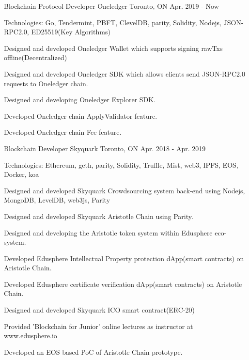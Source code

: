 \vspace{-2.0em}
\begin{cventries}
    \cventry
    {Blockchain Protocol Developer}
    {Oneledger}
    {Toronto, ON}
    {Apr. 2019 - Now}
    {
      \begin{cvitems}
        \item {Technologies: Go, Tendermint, PBFT, ClevelDB, parity, Solidity, Nodejs, JSON-RPC2.0, ED25519(Key Algorithms)}
        \item {Designed and developed Oneledger Wallet which supports signing rawTxs offline(Decentralized)}
        \item {Designed and developed Oneledger SDK which allows clients send JSON-RPC2.0 requests to Oneledger chain.}
        \item {Designed and developing Oneledger Explorer SDK.}
        \item {Developed Oneledger chain ApplyValidator feature.}
        \item {Developed Oneledger chain Fee feature.}
      \end{cvitems}
    }

  \cventry
    {Blockchain Developer}
    {Skyquark}
    {Toronto, ON}
    {Apr. 2018 - Apr. 2019}
    {
      \begin{cvitems}
        \item {Technologies: Ethereum, geth, parity, Solidity, Truffle, Mist, web3, IPFS, EOS, Docker, koa}
        \item {Designed and developed Skyquark Crowdsourcing system back-end using Nodejs, MongoDB, LevelDB, web3js, Parity}
        \item {Designed and developed Skyquark Aristotle Chain using Parity.}
        \item {Designed and developing the Aristotle token system within Edusphere eco-system.}
        \item {Developed Edusphere Intellectual Property protection dApp(smart contracts) on Aristotle Chain.}
        \item {Developed Edusphere certificate verification dApp(smart contracts) on Aristotle Chain.}
        \item {Designed and developed Skyquark ICO smart contract(ERC-20)}
        \item {Provided 'Blockchain for Junior' online lectures as instructor at www.edusphere.io}
        \item {Developed an EOS based PoC of Aristotle Chain prototype.}
      \end{cvitems}
    }
	


\end{cventries}
